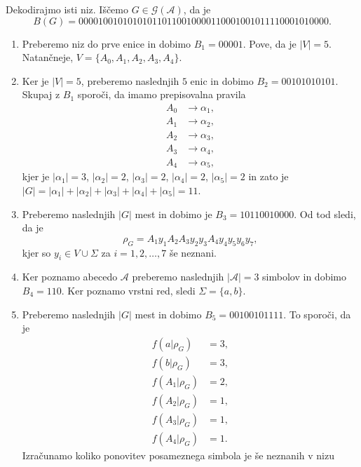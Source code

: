 \documentclass[fin1, tisk]{fmfdelo}
\providecommand{\abs}[1]{\left\lvert #1 \right\rvert}
\newcommand{\A}{\mathcal{A}}
\newcommand{\G}{\mathcal{G}}
\theoremstyle{definition}
\begin{document}
\begin{primer}
    Dekodirajmo isti niz. Iščemo $G \in \G(\A)$, da je
    \[
        B(G) = 00001 00101010101 10110010000 110 00100101111 0001010000.
    \]
    \begin{enumerate}
        \item Preberemo niz do prve enice in dobimo $B_1 = 00001$. Pove, da je $\abs{V} = 5 $.
        Natančneje, $V = \{ A_0, A_1, A_2, A_3, A_4\}$.
        \item Ker je $\abs{V} = 5$, preberemo naslednjih $5$ enic in dobimo $B_2 = 00101010101$.
        Skupaj z $B_1$ sporoči, da imamo prepisovalna pravila
        \begin{align*}
            A_0 &\rightarrow \alpha_1, \\
            A_1 &\rightarrow \alpha_2, \\
            A_2 &\rightarrow \alpha_3, \\
            A_3 &\rightarrow \alpha_4, \\
            A_4 &\rightarrow \alpha_5,
        \end{align*}
        kjer je $\abs{\alpha_1} = 3$, $\abs{\alpha_2} = 2$, $\abs{\alpha_3} = 2$,
        $\abs{\alpha_4} = 2$, $\abs{\alpha_5} = 2$ in zato je
        $\abs{G} = \abs{\alpha_1} + \abs{\alpha_2} + \abs{\alpha_3} + \abs{\alpha_4} + \abs{\alpha_5} = 11$.
        \item Preberemo naslednjih $\abs{G}$ mest in dobimo je $B_3 = 10110010000$.
        Od tod sledi, da je 
        \[
            \rho_G = A_1y_1A_2A_3y_2y_3A_4y_4y_5y_6y_7,
        \]
        kjer so $y_i \in V \cup \Sigma$ za $i = 1,2, \ldots, 7$ še neznani.
        \item Ker poznamo abecedo $\A$ preberemo naslednjih $\abs{\A} = 3$ simbolov in dobimo
        $B_4 = 110$. Ker poznamo vrstni red, sledi $\Sigma = \{ a, b \}$.
        \item Preberemo naslednjih $\abs{G}$ mest in dobimo $B_5 = 00100101111$. To sporoči,
        da je
        \begin{align*}
            f(a|\rho_G) &= 3,\\
            f(b|\rho_G) &= 3,\\
            f(A_1|\rho_G) &= 2,\\
            f(A_2|\rho_G) &= 1,\\
            f(A_3|\rho_G) &= 1,\\
            f(A_4|\rho_G) &= 1.
        \end{align*}
        Izračunamo koliko ponovitev posameznega simbola je še neznanih v nizu

\end{enumerate}
\end{primer}
\end{document}
